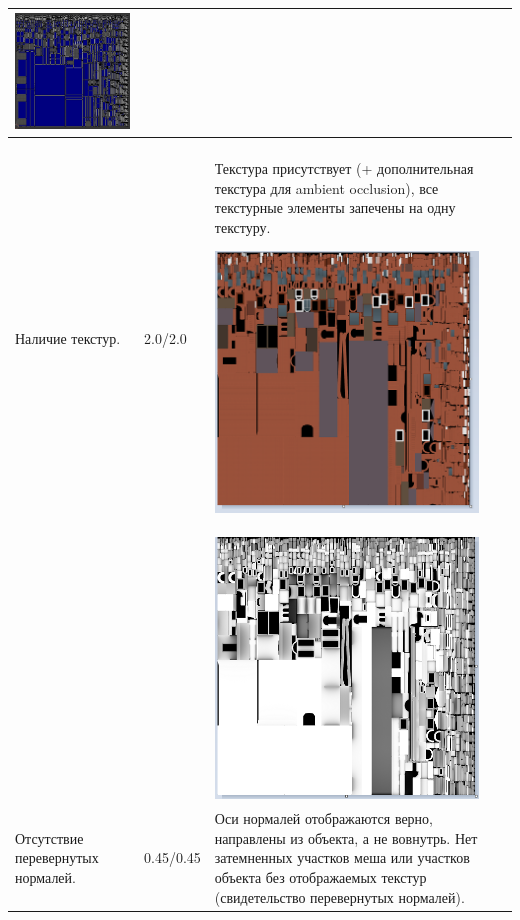 \begin{longtable}{|p{4cm}|p{2.5cm}|p{7.5cm}|}
    \includegraphics[width=7cm]{src/uv_2} \\
    \hline\\
    Наличие текстур. & 2.0/2.0 & Текстура присутствует (+ дополнительная текстура для ambient occlusion), все текстурные элементы запечены на одну текстуру.

    \includegraphics[width=7cm]{src/tec_3}\\
    & & \includegraphics[width=7cm]{src/tec_4}\\
    \hline
    Отсутствие перевернутых нормалей. & 0.45/0.45 & Оси нормалей отображаются верно, направлены из объекта, а не вовнутрь. Нет затемненных участков меша или участков объекта без отображаемых текстур (свидетельство перевернутых нормалей).
    

\end{longtable}

